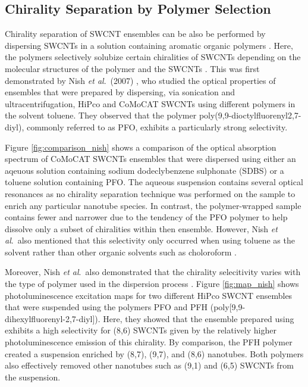 \subsection{Chirality Separation by Polymer Selection}

Chirality separation of SWCNT ensembles can be also be performed by dispersing SWCNTs in a solution containing aromatic organic polymers \cite{nish2007highly, chen2007toward, tange2011selective}. Here, the polymers selectively solubize certain chiralities of SWCNTs depending on the molecular structures of the polymer and the  SWCNTs \cite{nish2007highly}. This was first demonstrated by Nish \textit{et al}.\ (2007) \cite{nish2007highly}, who studied the optical properties of ensembles that were prepared by dispersing, via sonication and ultracentrifugation, HiPco and CoMoCAT SWCNTs using different polymers in the solvent toluene. They observed that the polymer poly(9,9-dioctylfluorenyl2,7-diyl), commonly referred to as PFO, exhibits a particularly strong selectivity.

Figure \ref{fig:comparison_nish} shows a comparison of the optical absorption spectrum of CoMoCAT SWCNTs ensembles that were dispersed using either an aqeuous solution containing sodium dodeclybenzene sulphonate (SDBS) or a toluene solution containing PFO. The aqueous suspension contains several optical resonances as no chirality separation technique was performed on the sample to enrich any particular nanotube species. In contrast, the polymer-wrapped sample contains fewer and narrower due to the tendency of the PFO polymer to help dissolve only a subset of chiralities within then ensemble. However, Nish \textit{et al}.\ also mentioned that this selectivity only occurred when using toluene as the solvent rather than other organic solvents such as choloroform \cite{nish2007highly}.


Moreover, Nish \textit{et al}.\ also demonstrated that the chirality selecitivity varies with the type of polymer used in the dispersion process \cite{nish2007highly}. Figure \ref{fig:map_nish} shows photoluminescence excitation maps for two different HiPco SWCNT ensembles that were suspended using the polymers PFO and PFH (poly[9,9-dihexylfluorenyl-2,7-diyl]). Here, they showed that the ensemble prepared using exhibits a high selectivity for (8,6) SWCNTs given by the relatively higher photoluminescence emission of this chirality. By comparison, the PFH polymer created a suspension enriched by (8,7), (9,7), and (8,6) nanotubes. Both polymers also effectively removed other nanotubes such as (9,1) and (6,5) SWCNTs from the suspension.




